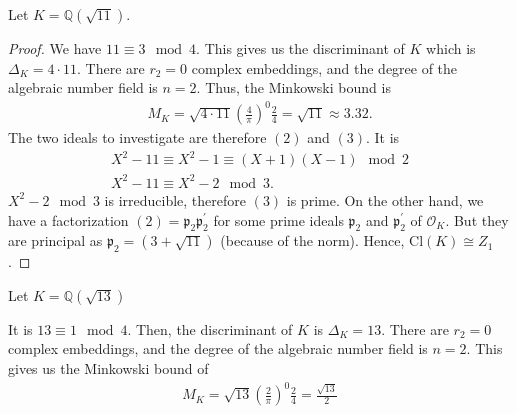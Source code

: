 \begin{exmbox}
    \begin{example}
        Let \(K = \mathbb{Q}(\sqrt{11})\).
    \end{example}
\end{exmbox}
\begin{proof}
    We have \(11 \equiv 3 \mod{4}\). This gives us the discriminant of \(K\) which is \(\Delta_K = 4 \cdot 11\). There are \(r_2 = 0\) complex embeddings, and the degree of the algebraic number field is \(n = 2\). Thus, the Minkowski bound is
    \begin{align*}
        M_K = \sqrt{4 \cdot 11} \left(\frac{4}{\pi}\right)^0 \frac{2}{4} = \sqrt{11} \approx 3.32 \text{.}
    \end{align*}
    The two ideals to investigate are therefore \((2)\) and \((3)\). It is
    \begin{align*}
        X^2 - 11 \equiv X^2 - 1 \equiv (X + 1)(X - 1) \mod{2} \\
        X^2 - 11 \equiv X^2 - 2 \mod{3} \text{.}
    \end{align*}
    \(X^2 - 2 \mod{3}\) is irreducible, therefore \((3)\) is prime. On the other hand, we have a factorization \((2) = \mathfrak{p}_2 \mathfrak{p}_2^\prime\) for some prime ideals \(\mathfrak{p}_2\) and \(\mathfrak{p}_2^\prime\) of \(\mathcal{O}_K\). But they are principal as \(\mathfrak{p}_2 = (3 + \sqrt{11})\) (because of the norm). Hence, \(\mathrm{Cl}(K) \cong Z_1\).
\end{proof}

\begin{exmbox}
    \begin{example}
        Let \(K = \mathbb{Q}(\sqrt{13})\)
    \end{example}
    It is \(13 \equiv 1 \mod{4}\). Then, the discriminant of \(K\) is \(\Delta_K = 13\). There are \(r_2 = 0\) complex embeddings, and the degree of the algebraic number field is \(n = 2\). This gives us the Minkowski bound of
    \begin{align*}
        M_K = \sqrt{13} \left(\frac{2}{\pi}\right)^0 \frac{2}{4} = \frac{\sqrt{13}}{2}
    \end{align*}
\end{exmbox}












